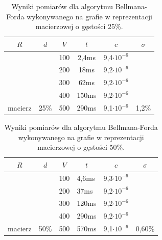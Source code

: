 \documentclass[a4paper,12pt]{article}
\begin{document}
\begin{table}[H]
	\centering
	\caption{\centering Wyniki pomiarów dla algorytmu Bellmana-Forda wykonywanego na grafie w reprezentacji macierzowej o gęstości 25\%.}
	\begin{tabular}{|c|c|c|c|c|c|}
		\hline
		\rowcolor[HTML]{C0C0C0} 
		$R$                       & $d$                    & $V$ & $t$   & $c$                & $\sigma$                \\ \hline
		&                        & 100 & 2,4ms & 9,4$\cdot 10^{-6}$ &                         \\ \cline{3-5}
		&                        & 200 & 18ms  & 9,2$\cdot 10^{-6}$ &                         \\ \cline{3-5}
		&                        & 300 & 62ms  & 9,2$\cdot 10^{-6}$ &                         \\ \cline{3-5}
		&                        & 400 & 150ms & 9,2$\cdot 10^{-6}$ &                         \\ \cline{3-5}
		\multirow{-5}{*}{macierz} & \multirow{-5}{*}{25\%} & 500 & 290ms & 9,1$\cdot 10^{-6}$ & \multirow{-5}{*}{1,2\%} \\ \hline
	\end{tabular}
\end{table}

\begin{table}[H]
	\centering
	\caption{\centering Wyniki pomiarów dla algorytmu Bellmana-Forda wykonywanego na grafie w reprezentacji macierzowej o gęstości 50\%.}
	\begin{tabular}{|c|c|c|l|c|c|}
		\hline
		\rowcolor[HTML]{C0C0C0} 
		$R$                       & $d$                    & $V$ & \multicolumn{1}{c|}{\cellcolor[HTML]{C0C0C0}$t$} & $c$                & $\sigma$                 \\ \hline
		&                        & 100 & 4,6ms                                            & 9,3$\cdot 10^{-6}$ &                          \\ \cline{3-5}
		&                        & 200 & 37ms                                             & 9,2$\cdot 10^{-6}$ &                          \\ \cline{3-5}
		&                        & 300 & 120ms                                            & 9,2$\cdot 10^{-6}$ &                          \\ \cline{3-5}
		&                        & 400 & 290ms                                            & 9,2$\cdot 10^{-6}$ &                          \\ \cline{3-5}
		\multirow{-5}{*}{macierz} & \multirow{-5}{*}{50\%} & 500 & 570ms                                            & 9,1$\cdot 10^{-6}$ & \multirow{-5}{*}{0,60\%} \\ \hline
	\end{tabular}
\end{table}
\end{document}
